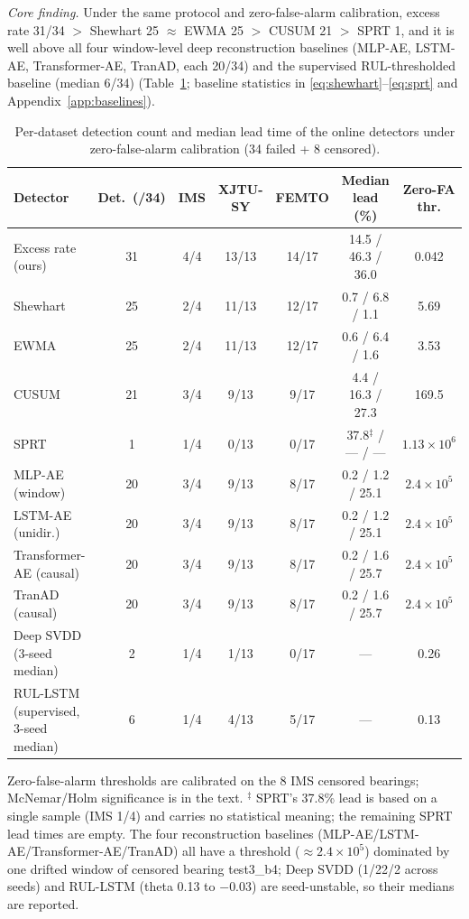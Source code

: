 \documentclass[journal]{IEEEtran}
\begin{document}
\emph{Core finding.} Under the same protocol and zero-false-alarm calibration, excess rate 31/34 $>$ Shewhart 25 $\approx$ EWMA 25 $>$ CUSUM 21 $>$ SPRT 1, and it is well above all four window-level deep reconstruction baselines (MLP-AE, LSTM-AE, Transformer-AE, TranAD, each 20/34) and the supervised RUL-thresholded baseline (median 6/34) (Table~\ref{tab:detectors}; baseline statistics in \eqref{eq:shewhart}--\eqref{eq:sprt} and Appendix~\ref{app:baselines}).

\begin{table}[!t]
\caption{Per-dataset detection count and median lead time of the online detectors under zero-false-alarm calibration (34 failed + 8 censored).}
\label{tab:detectors}
\centering
\begin{tabular}{l c c c c c c}
\toprule
Detector & Det.\ (/34) & IMS & XJTU-SY & FEMTO & Median lead (\%) & Zero-FA thr.\\
\midrule
Excess rate (ours) & 31 & 4/4 & 13/13 & 14/17 & 14.5 / 46.3 / 36.0 & 0.042\\
Shewhart & 25 & 2/4 & 11/13 & 12/17 & 0.7 / 6.8 / 1.1 & 5.69\\
EWMA & 25 & 2/4 & 11/13 & 12/17 & 0.6 / 6.4 / 1.6 & 3.53\\
CUSUM & 21 & 3/4 & 9/13 & 9/17 & 4.4 / 16.3 / 27.3 & 169.5\\
SPRT & 1 & 1/4 & 0/13 & 0/17 & 37.8$^{\ddagger}$ / --- / --- & $1.13\times10^{6}$\\
MLP-AE (window) & 20 & 3/4 & 9/13 & 8/17 & 0.2 / 1.2 / 25.1 & $2.4\times10^{5}$\\
LSTM-AE (unidir.) & 20 & 3/4 & 9/13 & 8/17 & 0.2 / 1.2 / 25.1 & $2.4\times10^{5}$\\
Transformer-AE (causal) & 20 & 3/4 & 9/13 & 8/17 & 0.2 / 1.6 / 25.7 & $2.4\times10^{5}$\\
TranAD (causal) & 20 & 3/4 & 9/13 & 8/17 & 0.2 / 1.6 / 25.7 & $2.4\times10^{5}$\\
Deep SVDD (3-seed median) & 2 & 1/4 & 1/13 & 0/17 & --- & 0.26\\
RUL-LSTM (supervised, 3-seed median) & 6 & 1/4 & 4/13 & 5/17 & --- & 0.13\\
\bottomrule
\end{tabular}
\par\vspace{2pt}
{\footnotesize Zero-false-alarm thresholds are calibrated on the 8 IMS censored bearings; McNemar/Holm significance is in the text. $^{\ddagger}$ SPRT's 37.8\% lead is based on a single sample (IMS 1/4) and carries no statistical meaning; the remaining SPRT lead times are empty. The four reconstruction baselines (MLP-AE/LSTM-AE/Transformer-AE/TranAD) all have a threshold ($\approx2.4\times10^{5}$) dominated by one drifted window of censored bearing test3\_b4; Deep SVDD (1/22/2 across seeds) and RUL-LSTM (theta 0.13 to $-0.03$) are seed-unstable, so their medians are reported.}
\end{table}
\end{document}
